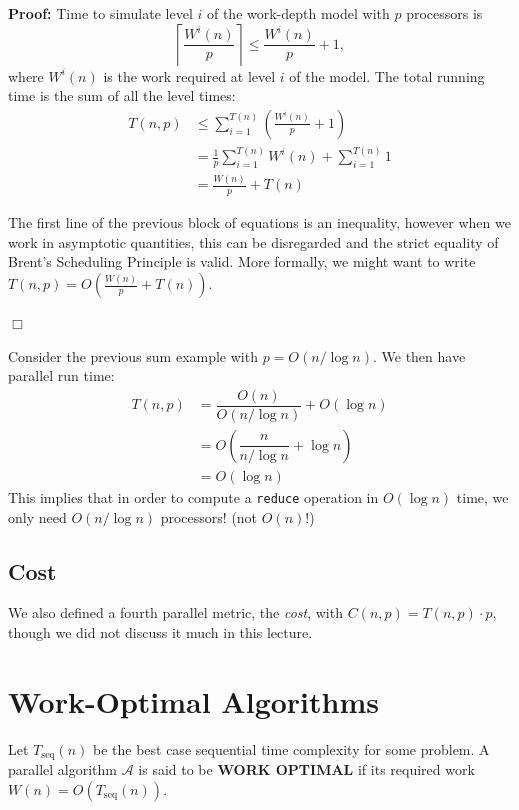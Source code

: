 \documentclass[twoside]{article}
\begin{document}
\textbf{Proof:} Time to simulate level $i$ of the work-depth model with $p$ processors is
\[
\left\lceil\frac{W^{i}(n)}{p}\right\rceil \leq \frac{W^{i}(n)}{p} + 1,
\]
where $W^{i}(n)$ is the work required at level $i$ of the model. The total running time is the sum of all the level times:
\begin{align*}
T(n,p) &\leq \sum_{i=1}^{T(n)}\left( \frac{W^{i}(n)}{p} + 1 \right) \\
	&= \frac{1}{p}\sum_{i=1}^{T(n)}W^{i}(n) + \sum_{i=1}^{T(n)}1\\
	&= \frac{W(n)}{p} + T(n)
\end{align*}

The first line of the previous block of equations is an inequality, however when we work in asymptotic quantities, this can be disregarded and the strict equality of Brent's Scheduling Principle is valid. More formally, we might want to write $T(n,p) = O\left(\frac{W(n)}{p} + T(n)\right)$.
\begin{flushright}
$\Box$
\end{flushright}

Consider the previous sum example with $p = O(n/\log n)$. We then have parallel run time:
\begin{align*}
T(n,p) 	&= \dfrac{O(n)}{O(n/\log n)} + O(\log n)\\
		&= O\left(\dfrac{n}{n/\log n} + \log n\right)\\
		&= O(\log n)
\end{align*}
This implies that in order to compute a \texttt{reduce} operation in $O(\log n)$ time, we only need $O(n/\log n)$ processors! (not $O(n)$!)

\subsection{Cost}
We also defined a fourth parallel metric, the \textit{cost}, with $C(n,p) = T(n,p)\cdot p$, though we did not discuss it much in this lecture.


\section{Work-Optimal Algorithms}
Let $T_{\text{seq}}(n)$ be the best case sequential time complexity for some problem. A parallel algorithm $\mathcal{A}$ is said to be \textbf{WORK OPTIMAL} if its required work $W(n) = O(T_{\text{seq}}(n))$.
\end{document}
